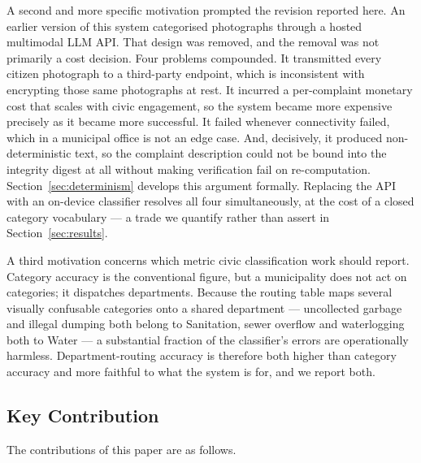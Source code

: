 \documentclass[conference]{IEEEtran}
\begin{document}
A second and more specific motivation prompted the revision reported here. An earlier version of this system categorised photographs through a hosted multimodal LLM API. That design was removed, and the removal was not primarily a cost decision. Four problems compounded. It transmitted every citizen photograph to a third-party endpoint, which is inconsistent with encrypting those same photographs at rest. It incurred a per-complaint monetary cost that scales with civic engagement, so the system became more expensive precisely as it became more successful. It failed whenever connectivity failed, which in a municipal office is not an edge case. And, decisively, it produced non-deterministic text, so the complaint description could not be bound into the integrity digest at all without making verification fail on re-computation. Section~\ref{sec:determinism} develops this argument formally. Replacing the API with an on-device classifier resolves all four simultaneously, at the cost of a closed category vocabulary --- a trade we quantify rather than assert in Section~\ref{sec:results}.

A third motivation concerns which metric civic classification work should report. Category accuracy is the conventional figure, but a municipality does not act on categories; it dispatches departments. Because the routing table maps several visually confusable categories onto a shared department --- uncollected garbage and illegal dumping both belong to Sanitation, sewer overflow and waterlogging both to Water --- a substantial fraction of the classifier's errors are operationally harmless. Department-routing accuracy is therefore both higher than category accuracy and more faithful to what the system is for, and we report both.

\subsection{Key Contribution}
The contributions of this paper are as follows.
\end{document}

